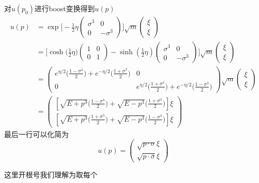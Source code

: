 \begin{exercise}{对$u(p_0)$进行boost变换得到$u(p)$}
\begin{align}\nonumber
u(p) & = \exp \bigg[ - \frac{1}{2} \eta \begin{pmatrix}
\sigma^3 & 0 \\ 
0 & - \sigma^3
\end{pmatrix} \bigg] \sqrt{m} \begin{pmatrix}
\xi \\ \xi
\end{pmatrix} \\ \nonumber
& = \bigg[ \cosh\big(\frac{1}{2}\eta\big)\begin{pmatrix}
1 & 0 \\
0 & 1
\end{pmatrix} - \sinh (\frac{1}{2}\eta) \begin{pmatrix}
\sigma^3 & 0 \\ \nonumber
0 & - \sigma^3
\end{pmatrix} \bigg]\sqrt{m} \begin{pmatrix}
\xi \\ \xi
\end{pmatrix} \\ \nonumber
& = \begin{pmatrix}
e^{\eta/2}\bigg(\frac{1-\sigma^3}{2}\bigg)+e^{-\eta/2}\bigg(\frac{1+\sigma^3}{2}\bigg) & 0\\
0 & e^{\eta/2}\bigg(\frac{1+\sigma^3}{2}\bigg)+e^{-\eta/2}\bigg(\frac{1-\sigma^3}{2}\bigg)
\end{pmatrix}\sqrt{m}\begin{pmatrix}
\xi \\ 
\xi
\end{pmatrix} \\\nonumber
& = \begin{pmatrix}
[\sqrt{E+p^3}\bigg(\frac{1-\sigma^3}{2}\bigg)+\sqrt{E-p^3}\bigg(\frac{1+\sigma^3}{2}\bigg)]\xi \\
[\sqrt{E+p^3}\bigg(\frac{1+\sigma^3}{2}\bigg)+\sqrt{E-p^3}\bigg(\frac{1-\sigma^3}{2}\bigg)]\xi
\end{pmatrix}
\end{align}
最后一行可以化简为
\begin{equation}
u(p) = \begin{pmatrix}
\sqrt{p\cdot\sigma}\xi \\
\sqrt{p\cdot\bar\sigma}\xi
\end{pmatrix}
\end{equation}
\end{exercise}
这里开根号我们理解为取每个
